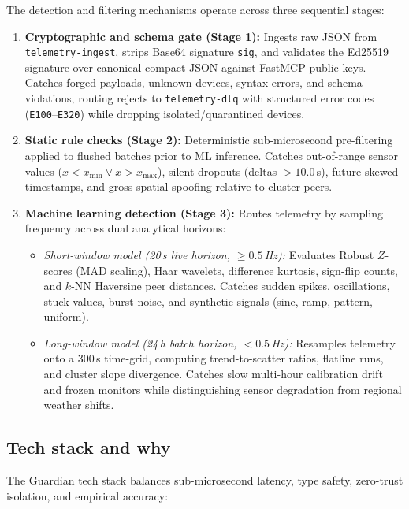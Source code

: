 \documentclass[11pt,a4paper]{article}
\begin{document}
The detection and filtering mechanisms operate across three sequential stages:
\begin{enumerate}[leftmargin=*,itemsep=2pt,topsep=2pt]
  \item \textbf{Cryptographic and schema gate (Stage 1):} Ingests raw JSON from \texttt{telemetry-ingest}, strips Base64 signature \texttt{sig}, and validates the Ed25519 signature over canonical compact JSON against FastMCP public keys. Catches forged payloads, unknown devices, syntax errors, and schema violations, routing rejects to \texttt{telemetry-dlq} with structured error codes (\texttt{E100}--\texttt{E320}) while dropping isolated/quarantined devices.
  \item \textbf{Static rule checks (Stage 2):} Deterministic sub-microsecond pre-filtering applied to flushed batches prior to ML inference. Catches out-of-range sensor values ($x < x_{\min} \lor x > x_{\max}$), silent dropouts (deltas $> 10.0$\,s), future-skewed timestamps, and gross spatial spoofing relative to cluster peers.
  \item \textbf{Machine learning detection (Stage 3):} Routes telemetry by sampling frequency across dual analytical horizons:
  \begin{itemize}[leftmargin=*,itemsep=1pt]
    \item \textit{Short-window model (20\,s live horizon, $\ge 0.5$\,Hz):} Evaluates Robust $Z$-scores (MAD scaling), Haar wavelets, difference kurtosis, sign-flip counts, and $k$-NN Haversine peer distances. Catches sudden spikes, oscillations, stuck values, burst noise, and synthetic signals (sine, ramp, pattern, uniform).
    \item \textit{Long-window model (24\,h batch horizon, $< 0.5$\,Hz):} Resamples telemetry onto a 300\,s time-grid, computing trend-to-scatter ratios, flatline runs, and cluster slope divergence. Catches slow multi-hour calibration drift and frozen monitors while distinguishing sensor degradation from regional weather shifts.
  \end{itemize}
\end{enumerate}

\subsection{Tech stack and why}
The Guardian tech stack balances sub-microsecond latency, type safety, zero-trust isolation, and empirical accuracy:
\end{document}
